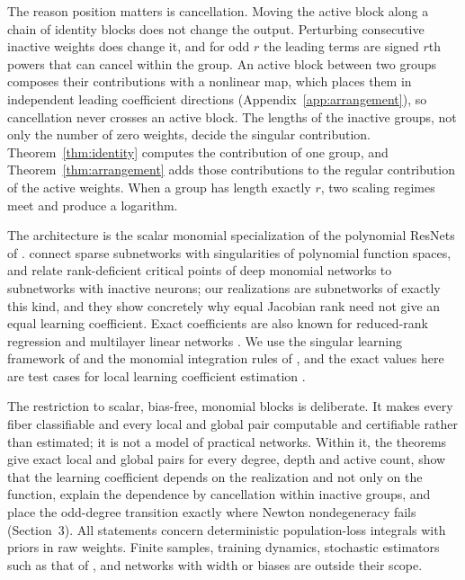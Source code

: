 \documentclass[11pt,letterpaper]{amsart}
\theoremstyle{scplain}
\begin{document}
The reason position matters is cancellation. Moving the active block along a chain of identity blocks does not change the output. Perturbing consecutive inactive weights does change it, and for odd $r$ the leading terms are signed $r$th powers that can cancel within the group. An active block between two groups composes their contributions with a nonlinear map, which places them in independent leading coefficient directions (Appendix~\ref{app:arrangement}), so cancellation never crosses an active block. The lengths of the inactive groups, not only the number of zero weights, decide the singular contribution. Theorem~\ref{thm:identity} computes the contribution of one group, and Theorem~\ref{thm:arrangement} adds those contributions to the regular contribution of the active weights. When a group has length exactly $r$, two scaling regimes meet and produce a logarithm.

The architecture is the scalar monomial specialization of the polynomial ResNets of \citet{dahlgren2026}. \citet{shahverdi2026} connect sparse subnetworks with singularities of polynomial function spaces, and \citet{kohn2026} relate rank-deficient critical points of deep monomial networks to subnetworks with inactive neurons; our realizations are subnetworks of exactly this kind, and they show concretely why equal Jacobian rank need not give an equal learning coefficient. Exact coefficients are also known for reduced-rank regression and multilayer linear networks \citep{aoyagiwatanabe2005,aoyagi2024}. We use the singular learning framework of \citet{watanabe2009} and the monomial integration rules of \citet{lin2017}, and the exact values here are test cases for local learning coefficient estimation \citep{lau2025}.

The restriction to scalar, bias-free, monomial blocks is deliberate. It makes every fiber classifiable and every local and global pair computable and certifiable rather than estimated; it is not a model of practical networks. Within it, the theorems give exact local and global pairs for every degree, depth and active count, show that the learning coefficient depends on the realization and not only on the function, explain the dependence by cancellation within inactive groups, and place the odd-degree transition exactly where Newton nondegeneracy fails (Section~3). All statements concern deterministic population-loss integrals with priors in raw weights. Finite samples, training dynamics, stochastic estimators such as that of \citet{lau2025}, and networks with width or biases are outside their scope.
\end{document}
